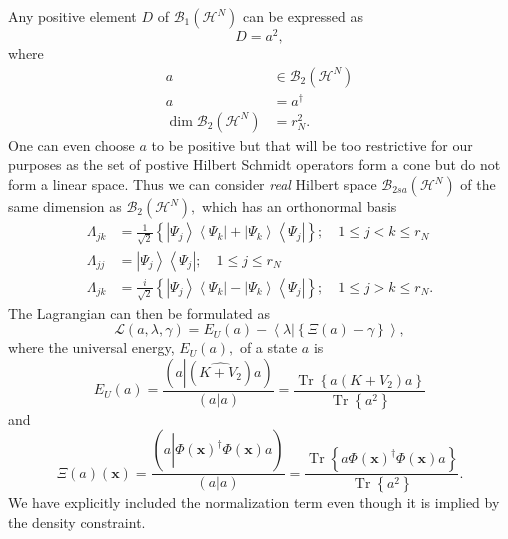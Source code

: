 \documentclass[aps,preprint]{revtex4}%
\begin{document}
Any positive element $D$ of $\mathcal{B}_{1}\left(  \mathcal{H}^{N}\right)  $
can be expressed as
\begin{equation}
D=a^{2},
\end{equation}
where
\begin{align}
a &  \in\mathcal{B}_{2}\left(  \mathcal{H}^{N}\right)  \nonumber\\
a &  =a^{\dagger}\nonumber\\
\dim\mathcal{B}_{2}\left(  \mathcal{H}^{N}\right)   &  =r_{N}^{2}.
\end{align}
One can even choose $a$ to be positive but that will be too restrictive for
our purposes as the set of postive Hilbert Schmidt operators form a cone but
do not form a linear space. Thus we can consider \emph{real} Hilbert space
$\mathcal{B}_{2sa}\left(  \mathcal{H}^{N}\right)  $ of the same dimension as
$\mathcal{B}_{2}\left(  \mathcal{H}^{N}\right)  ,$ which has an orthonormal
basis
\begin{align}
\Lambda_{jk} &  =\frac{1}{\sqrt{2}}\left\{  \left\vert \Psi_{j}\right\rangle
\left\langle \Psi_{k}\right\vert +\left\vert \Psi_{k}\right\rangle
\left\langle \Psi_{j}\right\vert \right\}  ;\quad1\leq j<k\leq r_{N}%
\nonumber\\
\Lambda_{jj} &  =\left\vert \Psi_{j}\right\rangle \left\langle \Psi
_{j}\right\vert ;\quad1\leq j\leq r_{N}\nonumber\\
\Lambda_{jk} &  =\frac{i}{\sqrt{2}}\left\{  \left\vert \Psi_{j}\right\rangle
\left\langle \Psi_{k}\right\vert -\left\vert \Psi_{k}\right\rangle
\left\langle \Psi_{j}\right\vert \right\}  ;\quad1\leq j>k\leq r_{N}.
\end{align}
The Lagrangian can then be formulated as
\begin{equation}
\mathcal{L}\left(  a,\lambda,\gamma\right)  =E_{U}\left(  a\right)
-\left\langle \lambda\left\vert \left\{  \Xi\left(  a\right)  -\gamma\right\}
\right.  \right\rangle ,
\end{equation}
where the universal energy, $E_{U}\left(  a\right)  ,$ of a state $a$ is
\begin{equation}
E_{U}\left(  a\right)  =\frac{\left(  a\left\vert \left(  \widehat{K+V_{2}%
}\right)  \right.  a\right)  }{\left(  \overset{}{a}\left\vert a\right.
\right)  }=\frac{\operatorname{Tr}\left\{  a\left(  K+V_{2}\right)  a\right\}
}{\operatorname{Tr}\left\{  a^{2}\right\}  }%
\end{equation}
and
\begin{equation}
\Xi\left(  a\right)  \left(  \mathbf{x}\right)  =\frac{\left(  a\left\vert
\widehat{\Phi\left(  \mathbf{x}\right)  ^{\dagger}\Phi\left(  \mathbf{x}%
\right)  }\right.  a\right)  }{\left(  \overset{}{a}\left\vert a\right.
\right)  }=\frac{\operatorname{Tr}\left\{  a\Phi\left(  \mathbf{x}\right)
^{\dagger}\Phi\left(  \mathbf{x}\right)  a\right\}  }{\operatorname{Tr}%
\left\{  a^{2}\right\}  }.
\end{equation}
We have explicitly included the normalization term even though it is implied
by the density constraint.
\end{document}
